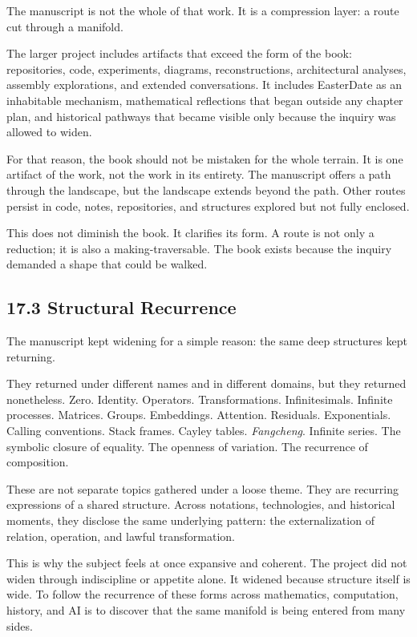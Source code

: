 \documentclass[
]{article}
\begin{document}
The manuscript is not the whole of that work. It is a compression layer:
a route cut through a manifold.

The larger project includes artifacts that exceed the form of the book:
repositories, code, experiments, diagrams, reconstructions,
architectural analyses, assembly explorations, and extended
conversations. It includes EasterDate as an inhabitable mechanism,
mathematical reflections that began outside any chapter plan, and
historical pathways that became visible only because the inquiry was
allowed to widen.

For that reason, the book should not be mistaken for the whole terrain.
It is one artifact of the work, not the work in its entirety. The
manuscript offers a path through the landscape, but the landscape
extends beyond the path. Other routes persist in code, notes,
repositories, and structures explored but not fully enclosed.

This does not diminish the book. It clarifies its form. A route is not
only a reduction; it is also a making-traversable. The book exists
because the inquiry demanded a shape that could be walked.

\hypertarget{structural-recurrence}{%
\subsection{17.3 Structural Recurrence}\label{structural-recurrence}}

The manuscript kept widening for a simple reason: the same deep
structures kept returning.

They returned under different names and in different domains, but they
returned nonetheless. Zero. Identity. Operators. Transformations.
Infinitesimals. Infinite processes. Matrices. Groups. Embeddings.
Attention. Residuals. Exponentials. Calling conventions. Stack frames.
Cayley tables. \emph{Fangcheng}. Infinite series. The symbolic closure
of equality. The openness of variation. The recurrence of composition.

These are not separate topics gathered under a loose theme. They are
recurring expressions of a shared structure. Across notations,
technologies, and historical moments, they disclose the same underlying
pattern: the externalization of relation, operation, and lawful
transformation.

This is why the subject feels at once expansive and coherent. The
project did not widen through indiscipline or appetite alone. It widened
because structure itself is wide. To follow the recurrence of these
forms across mathematics, computation, history, and AI is to discover
that the same manifold is being entered from many sides.
\end{document}

